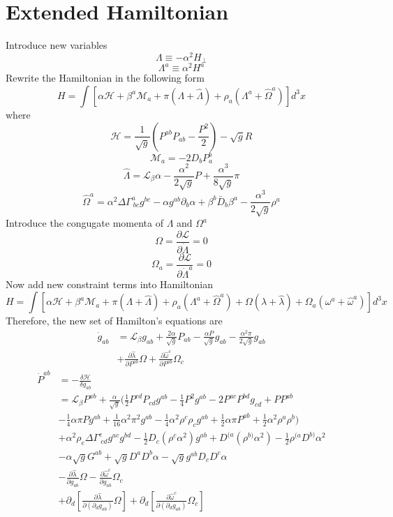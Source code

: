 \documentclass{article}
\begin{document}
\section{Extended Hamiltonian}
Introduce new variables
\[
\Lambda \equiv -\alpha^2 H_{\perp}
\]
\[
\Lambda^{a} \equiv \alpha^2 H^{a}
\]
Rewrite the Hamiltonian in the following form
\[
H = \int [\alpha \mathscr{H} + \beta^{a}\mathscr{M}_{a} + \pi (\Lambda + {\hat \Lambda}) + \rho_{a}(\Lambda^{a} + {\hat \Omega}^{a}) ]d^3 x
\]
where
\[
\mathscr{H} = \frac{1}{\sqrt{g}}(P^{ab}P_{ab} - \frac{P^2}{2}) - \sqrt{g}R
\]
\[
\mathscr{M}_{a} = -2D_{b}P^{b}_{a}
\]
\[
{\hat \Lambda} = \mathcal{L}_{\beta}\alpha - \frac{\alpha^2}{2\sqrt{g}}P + \frac{\alpha^3}{8\sqrt{g}}\pi
\]
\[
{\hat \Omega}^{a} = \alpha^2 \Delta \Gamma^{a}_{~bc}g^{bc} - \alpha g^{ab}\partial_{b} \alpha + \beta^{b}{\bar D}_{b} \beta^{a} - \frac{\alpha^3}{2\sqrt{g}}\rho^{a}
\]
Introduce the congugate momenta of $\Lambda$ and $\Omega^a$
\[
\Omega = \frac{\partial \mathscr{L}}{\partial {\dot \Lambda}} = 0
\]
\[
\Omega_{a} = \frac{\partial \mathscr{L}}{\partial {\dot \Lambda^{a}}} = 0
\]
Now add new constraint terms into Hamiltonian
\[
H = \int [\alpha \mathscr{H} + \beta^{a} \mathscr{M}_{a} + \pi (\Lambda + {\hat \Lambda}) + \rho_{a}(\Lambda^{a} + {\hat \Omega}^{a}) + \Omega(\lambda + {\hat \lambda}) +  \Omega_{a}(\omega^{a} + {\hat \omega}^{a})]d^3 x
\]
Therefore, the new set of Hamilton's equations are
\begin{align*}
{\dot g_{ab}} & = \mathcal{L}_{\beta}g_{ab} + \frac{2\alpha}{\sqrt{g}}P_{ab} - \frac{\alpha P}{\sqrt{g}}g_{ab} - \frac{\alpha^2 \pi }{2\sqrt{g}}g_{ab} \\
& + \frac{\partial {\hat \lambda}}{\partial P^{ab}}\Omega + \frac{\partial {\hat \omega}^{c}}{\partial P^{ab}}\Omega_{c}
\end{align*}
\begin{align*}
{\dot P^{ab}} & = -\frac{\delta \mathcal{H}}{\delta g_{ab}} \\ &
= \mathcal{L}_{\beta}P^{ab} + \frac{\alpha}{\sqrt{g}}(\frac{1}{2}P^{cd}P_{cd}g^{ab} - \frac{1}{4}P^{2}g^{ab} - 2P^{ac}P^{bd}g_{cd} + PP^{ab} \\
&-\frac{1}{4}\alpha \pi P g^{ab} + \frac{1}{16}\alpha^2 \pi^2 g^{ab} - \frac{1}{4}\alpha^2 \rho^{c}\rho_{c}g^{ab} + \frac{1}{2}\alpha \pi P^{ab} + \frac{1}{2}\alpha^2\rho^{a}\rho^{b}) \\
&+ \alpha^2 \rho_{e}\Delta \Gamma^{e}_{~cd}g^{ac}g^{bd} - \frac{1}{2}D_{c}(\rho^{c} \alpha^2)g^{ab} + D^{(a}(\rho^{b)} \alpha^2) - \frac{1}{2}\rho^{(a}D^{b)}\alpha^2\\
& - \alpha \sqrt{g}G^{ab} + \sqrt{g} D^{a}D^{b}\alpha - \sqrt{g}g^{ab}D_{c}D^{c} \alpha\\
& - \frac{\partial {\hat \lambda}}{\partial g_{ab}}\Omega - \frac{\partial {\hat \omega}^{c}}{\partial g_{ab}}\Omega_{c}\\
& + \partial_{d}[\frac{\partial {\hat \lambda}}{\partial(\partial_{d}g_{ab})}\Omega] + \partial_{d}[\frac{\partial {\hat \omega^{c}}}{\partial(\partial_{d}g_{ab})}\Omega_{c}]
\end{align*}
\end{document}
